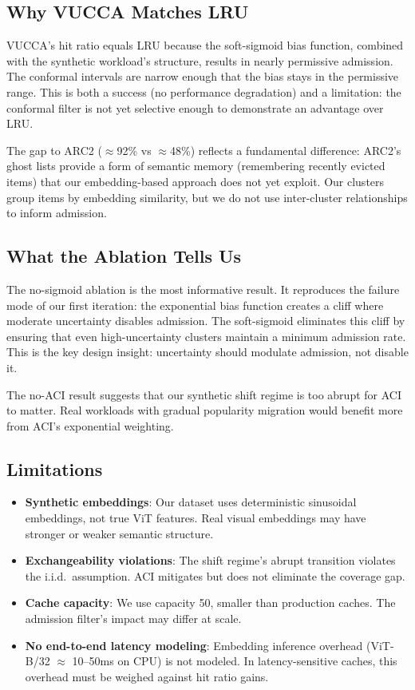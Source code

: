 \documentclass[11pt,letterpaper]{article}
\begin{document}
\subsection{Why VUCCA Matches LRU}

VUCCA's hit ratio equals LRU because the soft-sigmoid bias function, combined with the synthetic workload's structure, results in nearly permissive admission. The conformal intervals are narrow enough that the bias stays in the permissive range. This is both a success (no performance degradation) and a limitation: the conformal filter is not yet selective enough to demonstrate an advantage over LRU.

The gap to ARC2 ($\approx$92\% vs $\approx$48\%) reflects a fundamental difference: ARC2's ghost lists provide a form of semantic memory (remembering recently evicted items) that our embedding-based approach does not yet exploit. Our clusters group items by embedding similarity, but we do not use inter-cluster relationships to inform admission.

\subsection{What the Ablation Tells Us}

The no-sigmoid ablation is the most informative result. It reproduces the failure mode of our first iteration: the exponential bias function creates a cliff where moderate uncertainty disables admission. The soft-sigmoid eliminates this cliff by ensuring that even high-uncertainty clusters maintain a minimum admission rate. This is the key design insight: uncertainty should modulate admission, not disable it.

The no-ACI result suggests that our synthetic shift regime is too abrupt for ACI to matter. Real workloads with gradual popularity migration would benefit more from ACI's exponential weighting.

\subsection{Limitations}

\begin{itemize}
  \item \textbf{Synthetic embeddings}: Our dataset uses deterministic sinusoidal embeddings, not true ViT features. Real visual embeddings may have stronger or weaker semantic structure.
  \item \textbf{Exchangeability violations}: The shift regime's abrupt transition violates the i.i.d.\ assumption. ACI mitigates but does not eliminate the coverage gap.
  \item \textbf{Cache capacity}: We use capacity 50, smaller than production caches. The admission filter's impact may differ at scale.
  \item \textbf{No end-to-end latency modeling}: Embedding inference overhead (ViT-B/32 $\approx$ 10--50ms on CPU) is not modeled. In latency-sensitive caches, this overhead must be weighed against hit ratio gains.
\end{itemize}
\end{document}
